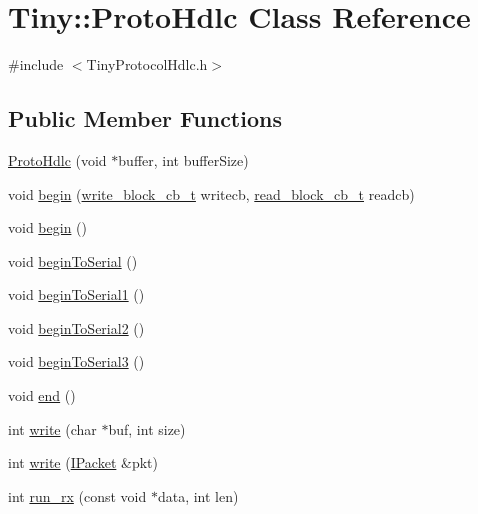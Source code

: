 \hypertarget{classTiny_1_1ProtoHdlc}{}\section{Tiny\+:\+:Proto\+Hdlc Class Reference}
\label{classTiny_1_1ProtoHdlc}


{\ttfamily \#include $<$Tiny\+Protocol\+Hdlc.\+h$>$}

\subsection*{Public Member Functions}
\begin{DoxyCompactItemize}
\item 
\hyperlink{classTiny_1_1ProtoHdlc_a82160439269af053f034d69a1b350cbc}{Proto\+Hdlc} (void $\ast$buffer, int buffer\+Size)
\item 
void \hyperlink{classTiny_1_1ProtoHdlc_acdc849f66b9f9a51d8930552ade56324}{begin} (\hyperlink{tiny__types_8h_aafd634660bba76cace57a8f9b01e044d}{write\+\_\+block\+\_\+cb\+\_\+t} writecb, \hyperlink{tiny__types_8h_a15bec127d9ee63658563d62e92b5261b}{read\+\_\+block\+\_\+cb\+\_\+t} readcb)
\item 
void \hyperlink{classTiny_1_1ProtoHdlc_aaaca3c70444d6a5f20e7e1fef492e99b}{begin} ()
\item 
void \hyperlink{classTiny_1_1ProtoHdlc_a8a54409e420954d93ada44ad0710740e}{begin\+To\+Serial} ()
\item 
void \hyperlink{classTiny_1_1ProtoHdlc_aadaf2dbaad53bba682d37e0650585491}{begin\+To\+Serial1} ()
\item 
void \hyperlink{classTiny_1_1ProtoHdlc_aed9903c8e65495e0260b4095113ee641}{begin\+To\+Serial2} ()
\item 
void \hyperlink{classTiny_1_1ProtoHdlc_a1c895863c008b9dbd4316ae10c6e4ea0}{begin\+To\+Serial3} ()
\item 
void \hyperlink{classTiny_1_1ProtoHdlc_ad4b84cbcd33d65e7df73321a0c19c420}{end} ()
\item 
int \hyperlink{classTiny_1_1ProtoHdlc_ae79c01f1c3614f0f382e8d8bf847b567}{write} (char $\ast$buf, int size)
\item 
int \hyperlink{classTiny_1_1ProtoHdlc_a3d02f2589397fb4a0e5be24a44321f9b}{write} (\hyperlink{classTiny_1_1IPacket}{I\+Packet} \&pkt)
\item 
int \hyperlink{classTiny_1_1ProtoHdlc_ae54e74de1a47d386f079c840fd830fe0}{run\+\_\+rx} (const void $\ast$data, int len)
\item 

\end{DoxyCompactItemize}
